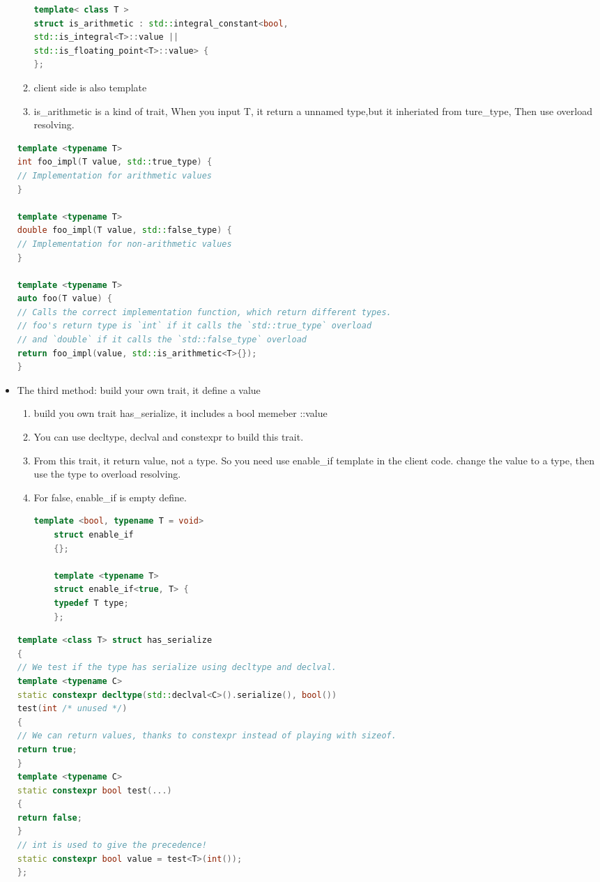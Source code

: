 \documentclass[a4paper,12pt,twoside]{book}
\begin{document}
\begin{itemize}
\begin{enumerate}
\begin{lstlisting}[frame=single, language=c++]
template< class T >
struct is_arithmetic : std::integral_constant<bool,
std::is_integral<T>::value ||
std::is_floating_point<T>::value> {
};
\end{lstlisting}

	\item client side is also template
	\item is\_arithmetic is a kind of trait, When you input T, it return a unnamed type,but it inheriated from ture\_type, Then use overload resolving.
\end{enumerate}
\begin{lstlisting}[frame=single, language=c++]
template <typename T>
int foo_impl(T value, std::true_type) {
// Implementation for arithmetic values
}

template <typename T>
double foo_impl(T value, std::false_type) {
// Implementation for non-arithmetic values
}

template <typename T>
auto foo(T value) {
// Calls the correct implementation function, which return different types.
// foo's return type is `int` if it calls the `std::true_type` overload
// and `double` if it calls the `std::false_type` overload
return foo_impl(value, std::is_arithmetic<T>{});
}
\end{lstlisting}

\item The third method: build your own trait, it define a value
\begin{enumerate}
	\item build you own trait has\_serialize, it includes a bool memeber ::value
	\item You can use decltype, declval and constexpr to build this trait. 
	\item From this trait, it return value, not a type. So you need use enable\_if template in the client code. change the value to a type, then use the type to overload resolving.
	\item For false, enable\_if is empty define.
	\begin{lstlisting}[frame=single, language=c++]
	template <bool, typename T = void>
	struct enable_if
	{};
	
	template <typename T>
	struct enable_if<true, T> {
	typedef T type;
	};
	\end{lstlisting}
\end{enumerate}
\begin{lstlisting}[frame=single, language=c++]
template <class T> struct has_serialize
{
// We test if the type has serialize using decltype and declval.
template <typename C>
static constexpr decltype(std::declval<C>().serialize(), bool())
test(int /* unused */)
{
// We can return values, thanks to constexpr instead of playing with sizeof.
return true;
}
template <typename C>
static constexpr bool test(...)
{
return false;
}
// int is used to give the precedence!
static constexpr bool value = test<T>(int());
};



\end{lstlisting}
\end{itemize}
\end{document}

